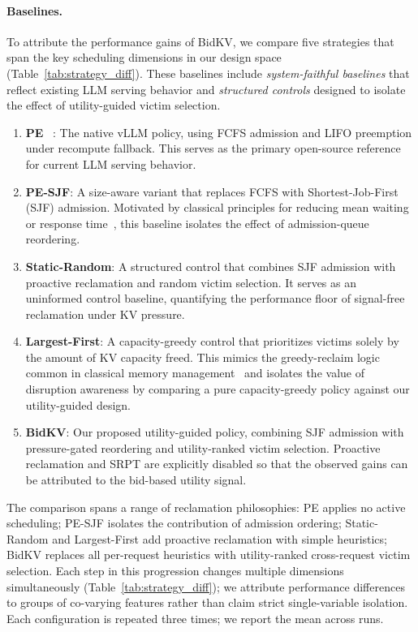 \documentclass[sigconf,nonacm]{acmart}
\newcommand{\bidkv}{BidKV\xspace}
\begin{document}
\paragraph{Baselines.}
To attribute the performance gains of \bidkv, we compare five strategies that span the key scheduling dimensions in our design space (Table~\ref{tab:strategy_diff}). These baselines include \emph{system-faithful baselines} that reflect existing LLM serving behavior and \emph{structured controls} designed to isolate the effect of utility-guided victim selection.

\begin{enumerate}[leftmargin=*,nosep]
    \item \textbf{PE} ~\cite{Kwon2023}: The native vLLM policy, using FCFS admission and LIFO preemption under recompute fallback. This serves as the primary open-source reference for current LLM serving behavior.

    \item \textbf{PE-SJF}: A size-aware variant that replaces FCFS with Shortest-Job-First (SJF) admission. Motivated by classical principles for reducing mean waiting or response time~\cite{Bansal2001SRPT, Gu2020Tiresias}, this baseline isolates the effect of admission-queue reordering.

    \item \textbf{Static-Random}: A structured control that combines SJF admission with proactive reclamation and random victim selection. It serves as an uninformed control baseline, quantifying the performance floor of signal-free reclamation under KV pressure.

    \item \textbf{Largest-First}: A capacity-greedy control that prioritizes victims solely by the amount of KV capacity freed. This mimics the greedy-reclaim logic common in classical memory management~\cite{Silberschatz2018} and isolates the value of disruption awareness by comparing a pure capacity-greedy policy against our utility-guided design.

    \item \textbf{\bidkv}: Our proposed utility-guided policy, combining SJF admission with pressure-gated reordering and utility-ranked victim selection. Proactive reclamation and SRPT are explicitly disabled so that the observed gains can be attributed to the bid-based utility signal.
\end{enumerate}

\noindent
The comparison spans a range of reclamation philosophies: PE applies no
active scheduling; PE-SJF isolates the contribution of admission ordering;
Static-Random and Largest-First add proactive reclamation with simple
heuristics; \bidkv replaces all per-request heuristics with utility-ranked
cross-request victim selection.  Each step in this progression changes multiple
dimensions simultaneously (Table~\ref{tab:strategy_diff}); we attribute
performance differences to groups of co-varying features rather than claim
strict single-variable isolation.  Each configuration is repeated three
times; we report the mean across runs.
\end{document}
